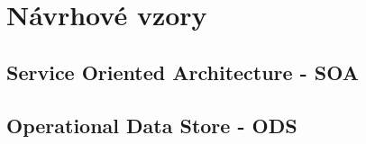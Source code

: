 \section{Návrhové vzory}

  \subsection{Service Oriented Architecture - SOA}

  \subsection{Operational Data Store - ODS}
